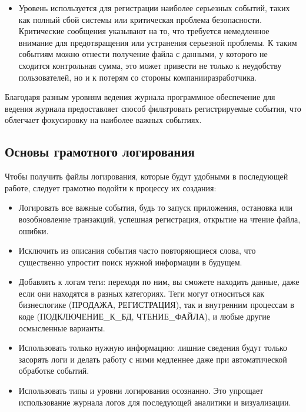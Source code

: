 \documentclass[letterpaper,10pt,russian]{sphinxmanual}
\begin{document}
\begin{itemize}
\item {} 
\sphinxAtStartPar
{}
Уровень  используется для регистрации наиболее серьезных событий, таких как полный сбой системы или критическая проблема безопасности. Критические сообщения указывают на то, что требуется немедленное внимание для предотвращения или устранения серьезной проблемы. К таким событиям можно отнести получение файла с данными, у которого не сходится контрольная сумма, это может привести не только к неудобству пользователей, но и к потерям со стороны компании\sphinxhyphen{}разработчика.

\end{itemize}

\sphinxAtStartPar
Благодаря разным уровням ведения журнала программное обеспечение для ведения журнала предоставляет способ фильтровать регистрируемые события, что облегчает фокусировку на наиболее важных событиях.


\subsection{Основы грамотного логирования}
\label{\detokenize{educational_materials/logging/content:id5}}
\sphinxAtStartPar
Чтобы получить файлы логирования, которые будут удобными в последующей работе, следует грамотно подойти к процессу их создания:
\begin{itemize}
\item {} 
\sphinxAtStartPar
Логировать все важные события, будь то запуск приложения, остановка или возобновление транзакций, успешная регистрация, открытие на чтение файла, ошибки.

\item {} 
\sphinxAtStartPar
Исключить из описания события часто повторяющиеся слова, что существенно упростит поиск нужной информации в будущем.

\item {} 
\sphinxAtStartPar
Добавлять к логам теги: переходя по ним, вы сможете находить данные, даже если они находятся в разных категориях. Теги могут относиться как бизнес\sphinxhyphen{}логике (ПРОДАЖА, РЕГИСТРАЦИЯ), так и внутренним процессам в коде (ПОДКЛЮЧЕНИЕ\_К\_БД, ЧТЕНИЕ\_ФАЙЛА), и любые другие осмысленные варианты.

\item {} 
\sphinxAtStartPar
Использовать только нужную информацию: лишние сведения будут только засорять логи и делать работу с ними медленнее даже при автоматической обработке событий.

\item {} 
\sphinxAtStartPar
Использовать типы и уровни логирования осознанно. Это упрощает использование журнала логов для последующей аналитики и визуализации.

\end{itemize}
\end{document}
